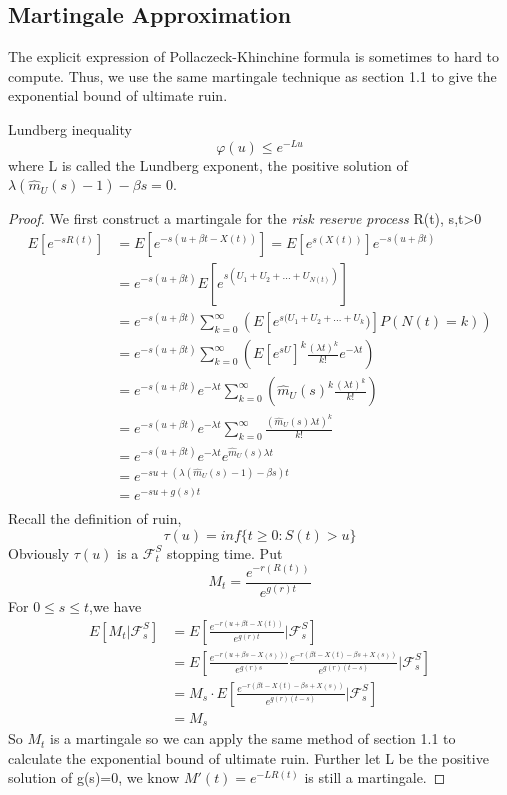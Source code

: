 \documentclass[project2.tex]{subfiles}
\begin{document}
\subsection{Martingale Approximation}
The explicit expression of Pollaczeck-Khinchine formula is sometimes to hard to compute. Thus, we use the same martingale technique as section 1.1 to give the exponential bound of ultimate ruin. 
\begin{theorem}Lundberg inequality
$$\varphi(u)\leq e^{-Lu}$$ where L is called the Lundberg exponent, the positive solution of $\lambda(\hat{m}_U(s)-1)-\beta s=0$.
\end{theorem}
\begin{proof}
We first construct a martingale for the {\it risk reserve process} R(t), s,t>0
\begin{align*}
E[e^{-sR(t)}]&=E[e^{-s(u+\beta t-X(t))}]=E[e^{s(X(t))}]e^{-s(u+\beta t)}\\
&=e^{-s(u+\beta t)}E[e^{s(U_1+U_2+...+U_{N(t)})}]\\
&=e^{-s(u+\beta t)}\sum_{k=0}^{\infty}(E[e^{s(U_1+U_2+...+U_k})]P(N(t)=k))\\
&=e^{-s(u+\beta t)}\sum_{k=0}^{\infty}(E[e^{sU}]^k\frac{(\lambda t)^k}{k!}e^{-\lambda t})\\
&=e^{-s(u+\beta t)}e^{-\lambda t}\sum_{k=0}^{\infty}(\hat{m}_U(s)^k\frac{(\lambda t)^k}{k!})\\
&=e^{-s(u+\beta t)}e^{-\lambda t}\sum_{k=0}^{\infty}\frac{(\hat{m}_U(s)\lambda t)^k}{k!}\\
&=e^{-s(u+\beta t)}e^{-\lambda t}e^{\hat{m}_U(s)\lambda t}\\
&=e^{-su+(\lambda(\hat{m}_U(s)-1)-\beta s)t}\\
&=e^{-su+g(s)t}\\
\end{align*}
Recall the definition of ruin, $$\tau(u)=inf\{t\geq 0:S(t)>u\}$$ Obviously $\tau(u)$ is a $\mathcal{F}^S_t$ stopping time. Put $$M_t=\frac{e^{-r(R(t))}}{e^{g(r)t}}$$ For $0\leq s\leq t$,we have
\begin{align*}
E[M_t|\mathcal{F}^S_s]&=E[\frac{e^{-r(u+\beta t-X(t))}}{e^{g(r)t}}|\mathcal{F}^S_s]\\
&=E[\frac{e^{-r(u+\beta s-X(s)))}}{e^{g(r)s}}\frac{e^{-r(\beta t-X(t)-\beta s+X(s))}}{e^{g(r)(t-s)}}|\mathcal{F}^S_s]\\
&=M_s\cdot E[\frac{e^{-r(\beta t-X(t)-\beta s+X(s))}}{e^{g(r)(t-s)}}|\mathcal{F}^S_s]\\
&=M_s
\end{align*}
So $M_t$ is a martingale so we can apply the same method of section 1.1 to calculate the exponential bound of ultimate ruin. Further let L be the positive solution of g(s)=0, we know $M'(t)=e^{-LR(t)}$ is still a martingale.

\end{proof}
\end{document}
